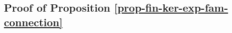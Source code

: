 %
%
%
%

\subsection{Proof of Proposition \ref{prop-fin-ker-exp-fam-connection}}\label{subsection-proof-prop-fin-ker-exp-fam-connection}

